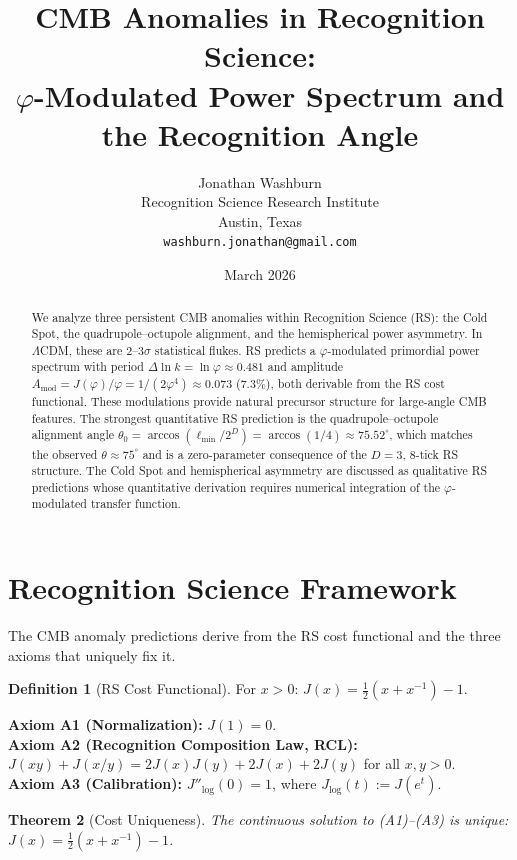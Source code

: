 \documentclass[12pt,a4paper]{article}
\title{CMB Anomalies in Recognition Science:\\
$\varphi$-Modulated Power Spectrum and the Recognition Angle}
\author{Jonathan Washburn\\
Recognition Science Research Institute\\
Austin, Texas\\
\texttt{washburn.jonathan@gmail.com}}
\date{March 2026}
\newtheorem{theorem}{Theorem}[section]
\theoremstyle{definition}
\newtheorem{definition}[theorem]{Definition}
\theoremstyle{remark}
\begin{document}
\maketitle

\begin{abstract}
We analyze three persistent CMB anomalies within Recognition Science
(RS): the Cold Spot, the quadrupole--octupole alignment, and the
hemispherical power asymmetry.  In $\Lambda$CDM, these are $2$--$3\sigma$
statistical flukes.  RS predicts a $\varphi$-modulated primordial power
spectrum with period $\Delta\ln k = \ln\varphi \approx 0.481$ and
amplitude $A_{\mathrm{mod}} = J(\varphi)/\varphi = 1/(2\varphi^4)
\approx 0.073$ ($7.3\%$), both derivable from the RS cost functional.
These modulations provide natural precursor structure for large-angle
CMB features.  The strongest quantitative RS prediction is the
quadrupole--octupole alignment angle $\theta_0 = \arccos(\ell_{\min}/2^D)
= \arccos(1/4) \approx 75.52^\circ$, which matches the observed
$\theta \approx 75^\circ$ and is a zero-parameter consequence of the
$D=3$, 8-tick RS structure.  The Cold Spot and hemispherical asymmetry
are discussed as qualitative RS predictions whose quantitative derivation
requires numerical integration of the $\varphi$-modulated transfer
function.
\end{abstract}

\section{Recognition Science Framework}
\label{sec:framework}

The CMB anomaly predictions derive from the RS cost functional and the
three axioms that uniquely fix it.

\begin{definition}[RS Cost Functional]
For $x > 0$: $J(x) = \tfrac{1}{2}(x + x^{-1}) - 1$.
\end{definition}

\noindent\textbf{Axiom A1 (Normalization):} $J(1) = 0$.\\
\textbf{Axiom A2 (Recognition Composition Law, RCL):}
$J(xy)+J(x/y)=2J(x)J(y)+2J(x)+2J(y)$ for all $x,y>0$.\\
\textbf{Axiom A3 (Calibration):} $J''_{\log}(0) = 1$, where
$J_{\log}(t) := J(e^t)$.

\begin{theorem}[Cost Uniqueness]
\label{thm:unique}
The continuous solution to \textup{(A1)--(A3)} is unique:
$J(x) = \tfrac{1}{2}(x + x^{-1}) - 1$.
\end{theorem}
\end{document}

